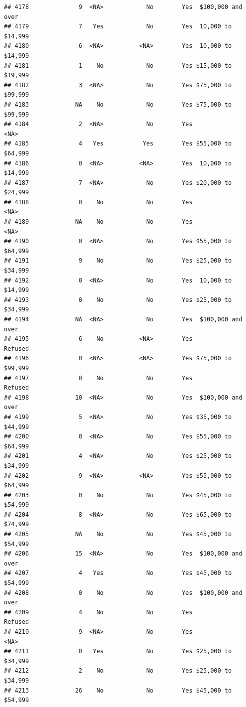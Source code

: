 \documentclass[man]{apa6}
\begin{document}
\begin{verbatim}
## 4178              9  <NA>            No        Yes  $100,000 and over
## 4179              7   Yes            No        Yes  10,000 to $14,999
## 4180              6  <NA>          <NA>        Yes  10,000 to $14,999
## 4181              1    No            No        Yes $15,000 to $19,999
## 4182              3  <NA>            No        Yes $75,000 to $99,999
## 4183             NA    No            No        Yes $75,000 to $99,999
## 4184              2  <NA>            No        Yes               <NA>
## 4185              4   Yes           Yes        Yes $55,000 to $64,999
## 4186              0  <NA>          <NA>        Yes  10,000 to $14,999
## 4187              7  <NA>            No        Yes $20,000 to $24,999
## 4188              0    No            No        Yes               <NA>
## 4189             NA    No            No        Yes               <NA>
## 4190              0  <NA>            No        Yes $55,000 to $64,999
## 4191              9    No            No        Yes $25,000 to $34,999
## 4192              0  <NA>            No        Yes  10,000 to $14,999
## 4193              0    No            No        Yes $25,000 to $34,999
## 4194             NA  <NA>            No        Yes  $100,000 and over
## 4195              6    No          <NA>        Yes            Refused
## 4196              0  <NA>          <NA>        Yes $75,000 to $99,999
## 4197              0    No            No        Yes            Refused
## 4198             10  <NA>            No        Yes  $100,000 and over
## 4199              5  <NA>            No        Yes $35,000 to $44,999
## 4200              0  <NA>            No        Yes $55,000 to $64,999
## 4201              4  <NA>            No        Yes $25,000 to $34,999
## 4202              9  <NA>          <NA>        Yes $55,000 to $64,999
## 4203              0    No            No        Yes $45,000 to $54,999
## 4204              8  <NA>            No        Yes $65,000 to $74,999
## 4205             NA    No            No        Yes $45,000 to $54,999
## 4206             15  <NA>            No        Yes  $100,000 and over
## 4207              4   Yes            No        Yes $45,000 to $54,999
## 4208              0    No            No        Yes  $100,000 and over
## 4209              4    No            No        Yes            Refused
## 4210              9  <NA>            No        Yes               <NA>
## 4211              0   Yes            No        Yes $25,000 to $34,999
## 4212              2    No            No        Yes $25,000 to $34,999
## 4213             26    No            No        Yes $45,000 to $54,999

\end{verbatim}
\end{document}
